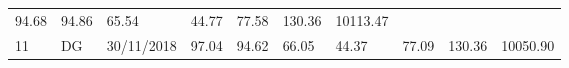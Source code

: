 \documentclass[
  11pt,
]{article}
\begin{document}
\begin{longtable}[]{@{}llllllllll@{}}
\begin{minipage}[t]{0.06\columnwidth}
94.68\strut
\end{minipage} & \begin{minipage}[t]{0.06\columnwidth}\raggedright
94.86\strut
\end{minipage} & \begin{minipage}[t]{0.06\columnwidth}\raggedright
65.54\strut
\end{minipage} & \begin{minipage}[t]{0.06\columnwidth}\raggedright
44.77\strut
\end{minipage} & \begin{minipage}[t]{0.06\columnwidth}\raggedright
77.58\strut
\end{minipage} & \begin{minipage}[t]{0.13\columnwidth}\raggedright
130.36\strut
\end{minipage} & \begin{minipage}[t]{0.08\columnwidth}\raggedright
10113.47\strut
\end{minipage}\tabularnewline
\begin{minipage}[t]{0.04\columnwidth}\raggedright
11\strut
\end{minipage} & \begin{minipage}[t]{0.09\columnwidth}\raggedright
DG\strut
\end{minipage} & \begin{minipage}[t]{0.10\columnwidth}\raggedright
30/11/2018\strut
\end{minipage} & \begin{minipage}[t]{0.06\columnwidth}\raggedright
97.04\strut
\end{minipage} & \begin{minipage}[t]{0.06\columnwidth}\raggedright
94.62\strut
\end{minipage} & \begin{minipage}[t]{0.06\columnwidth}\raggedright
66.05\strut
\end{minipage} & \begin{minipage}[t]{0.06\columnwidth}\raggedright
44.37\strut
\end{minipage} & \begin{minipage}[t]{0.06\columnwidth}\raggedright
77.09\strut
\end{minipage} & \begin{minipage}[t]{0.13\columnwidth}\raggedright
130.36\strut
\end{minipage} & \begin{minipage}[t]{0.08\columnwidth}\raggedright
10050.90\strut
\end{minipage}\tabularnewline

\end{longtable}
\end{document}
